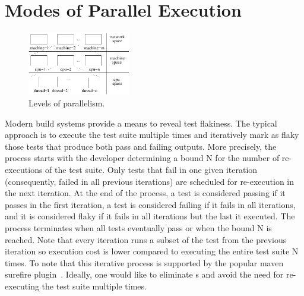 \section{Modes of Parallel Execution}

\begin{figure}[t]
  \centering
  \includegraphics[width=0.4\textwidth]{figs/parallel-levels.pdf}
  \caption{\label{fig:levels}Levels of parallelism.}
\end{figure}



Modern build systems provide a means to reveal test flakiness.  The
typical approach is to execute the test suite multiple times and
iteratively mark as flaky those tests that produce both pass and
failing outputs.  More precisely, the process starts with the
developer determining a bound N for the number of re-executions of the
test suite.  Only tests that fail in one given iteration
(consequently, failed in all previous iterations) are scheduled for
re-execution in the next iteration.  At the end of the process, a test
is considered passing if it passes in the first iteration, a test is
considered failing if it fails in all iterations, and it is considered
flaky if it fails in all iterations but the last it executed.  The
process terminates when all tests eventually pass or when the bound N
is reached.  Note that every iteration runs a subset of the test from
the previous iteration so execution cost is lower compared to
executing the entire test suite N times.  To note that this iterative
process is supported by the popular maven surefire
plugin~\cite{maven-surefire-plugin}.  Ideally, one would like to eliminate \pef{}s and
avoid the need for re-executing the test suite multiple times.
